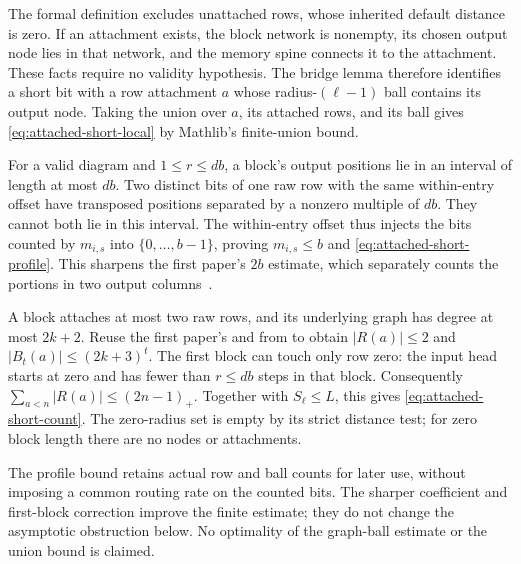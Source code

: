 \begin{outline}
The formal definition excludes unattached rows, whose inherited default
distance is zero. If an attachment exists, the block network is nonempty,
its chosen output node lies in that network, and the memory spine
connects it to the attachment. These facts require no validity
hypothesis. The bridge lemma therefore identifies a short bit with a
row attachment $a$ whose radius-$(\ell-1)$ ball contains its output
node. Taking the union over $a$, its attached rows, and its ball gives
\cref{eq:attached-short-local} by Mathlib's finite-union bound.

For a valid diagram and $1\le r\le db$, a block's output positions
lie in an interval of length at most $db$. Two distinct bits of one raw
row with the same within-entry offset have transposed positions separated
by a nonzero multiple of $db$. They cannot both lie in this interval.
The within-entry offset thus injects the bits counted by $m_{i,s}$ into
$\{0,\ldots,b-1\}$, proving $m_{i,s}\le b$ and
\cref{eq:attached-short-profile}. This sharpens the first paper's
$2b$ estimate, which separately counts the portions in two output
columns~\cite[section ``Codes on time--space diagrams'']{FirstPaper2026}.

A block attaches at most two raw rows, and its underlying graph has
degree at most $2k+2$. Reuse the first paper's
 and  from
 to obtain
$|R(a)|\le2$ and $|B_t(a)|\le(2k+3)^t$.
The first block can touch only row zero: the input head starts at zero
and has fewer than $r\le db$ steps in that block. Consequently
$\sum_{a<n}|R(a)|\le(2n-1)_+$. Together with $S_\ell\le L$,
this gives \cref{eq:attached-short-count}. The zero-radius set is empty by its
strict distance test; for zero block length there are no nodes or
attachments.
\end{outline}

The profile bound retains actual row and ball counts for later use,
without imposing a common routing rate on the counted bits. The sharper
coefficient and first-block correction improve the finite estimate;
they do not change the asymptotic obstruction below. No optimality of the
graph-ball estimate or the union bound is claimed.

